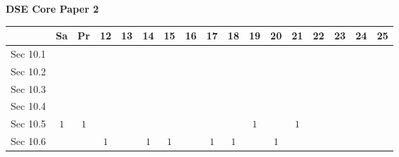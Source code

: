 \documentclass[12pt, a4paper]{article}
\begin{document}
\begin{absolutelynopagebreak}
\begin{center}
\textbf{DSE Core Paper 2}
\end{center}
\begin{center}
\begin{tabular}{|l|c|c|c|c|c|c|c|c|c|c|c|c|c|c|c|c|}
\hline
        & Sa & Pr & 12 & 13 & 14 & 15 & 16 & 17 & 18 & 19 & 20 & 21 & 22 & 23 & 24 & 25 \\\hline\hline
Sec 10.1 &  &  &  &  &  &  &  &  &  &  &  &  &  &  &  &  \\\hline
Sec 10.2 &  &  &  &  &  &  &  &  &  &  &  &  &  &  &  &  \\\hline
Sec 10.3 &  &  &  &  &  &  &  &  &  &  &  &  &  &  &  &  \\\hline
Sec 10.4 &  &  &  &  &  &  &  &  &  &  &  &  &  &  &  &  \\\hline
Sec 10.5 &  $1$ &  $1$ &  &  &  &  &  &  &  &  $1$ &  &  $1$ &  &  &  &  \\\hline
Sec 10.6 &  &  &  $1$ &  &  $1$ &  $1$ &  &  $1$ &  $1$ &  &  $1$ &  &  &  &  &  \\\hline
\end{tabular}
\end{center}
\end{absolutelynopagebreak}
\end{document}
